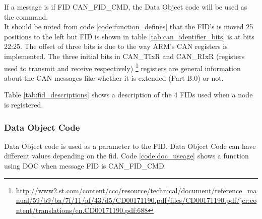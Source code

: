 If a message is if FID CAN\_FID\_CMD, the Data Object code will be used as the command.\\
It should be noted from code \ref{code:function_defines} that the FID's is moved 25 positions to the left but FID is shown in table \ref{tab:can_identifier_bits} is at bits 22:25. 
The offset of three bits is due to the way ARM's CAN registers is implemented. The three initial bits in CAN\_TIxR and CAN\_RIxR (registers used to transmit and receive respectively) \footnote{\url{http://www2.st.com/content/ccc/resource/technical/document/reference_manual/59/b9/ba/7f/11/af/43/d5/CD00171190.pdf/files/CD00171190.pdf/jcr:content/translations/en.CD00171190.pdf:688}} registers are general information about the CAN messages like whether it is extended (Part B.0) or not.
\begin{table}[H]
\centering
\caption{Descriptions of the FIDs mentioned in code \ref{code:function_defines}}
\label{tab:fid_descriptions}
\end{table}

Table \ref{tab:fid_descriptions} shows a description of the 4 FIDs used when a node is registered. 

\subsubsection{Data Object Code}
Data Object code is used as a parameter to the FID. Data Object Code can have different values depending on the fid. Code \ref{code:doc_useage} shows a function using DOC when message FID is CAN\_FID\_CMD.

